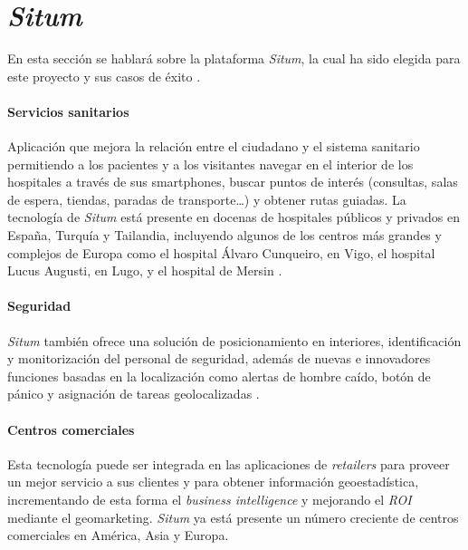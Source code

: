 \section{\textit{Situm}}
En esta sección se hablará sobre la plataforma \textit{Situm}, la cual ha sido elegida para este proyecto y sus casos de éxito \cite{situm_casos_nodate}.

\paragraph{Servicios sanitarios}
Aplicación que mejora la relación entre el ciudadano y el sistema sanitario permitiendo a los pacientes y a los visitantes navegar en el interior de los hospitales a través de sus smartphones, buscar puntos de interés (consultas, salas de espera, tiendas, paradas de transporte…) y obtener rutas guiadas.
La tecnología de \textit{Situm} está presente en docenas de hospitales públicos y privados en España, Turquía y Tailandia, incluyendo algunos de los centros más grandes y complejos de Europa como el hospital Álvaro Cunqueiro, en Vigo, el hospital Lucus Augusti, en Lugo, y el hospital de Mersin \cite{situm_indoor_2018}.

\paragraph{Seguridad}
\textit{Situm} también ofrece una solución de posicionamiento en interiores, identificación y monitorización del personal de seguridad, además de nuevas e innovadores funciones basadas en la localización como alertas de hombre caído, botón de pánico y asignación de tareas geolocalizadas \cite{securitas_seguridad_espana_securitas_2018}.

\paragraph{Centros comerciales}
Esta tecnología puede ser integrada en las aplicaciones de \textit{retailers} para proveer un mejor servicio a sus clientes y para obtener información geoestadística, incrementando de esta forma el \textit{business intelligence} y mejorando el \textit{ROI} mediante el geomarketing.
\textit{Situm} ya está presente un número creciente de centros comerciales en América, Asia y Europa.

